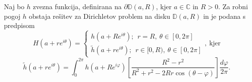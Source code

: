 \documentclass[mat1, tisk]{fmfdelo}
\begin{document}
    \begin{trditev}
        \label{alldisk}
        Naj bo $h$ zvezna funkcija, definirana na $\partial \mathbb{D}(a,R)$, kjer $a \in \mathbb{C}$ in $R>0$.  
        Za robni pogoj $h$ obstaja rešitev za Dirichletov problem na disku $\mathbb{D}(a,R)$ in je podana s predpisom
        $$
            H(a + r e^{i \theta}) = \begin{cases}
                    h(a + R e^{i \theta});~~r = R,~\theta \in [0, 2\pi]\\
                    \widetilde{h}(a + r e^{i \theta});~~ r \in [0,R),~ \theta \in [0, 2\pi]
            \end{cases},~\text{kjer}
        $$
        $$
        \widetilde{h}(a + r e^{i \theta}) = \int_{0}^{2 \pi}{h(a + R e^{i \varphi}) \left[\frac{R^2 - r^2}{R^2 + r^2 - 2Rr \cos(\theta - \varphi)}\right] \frac{d \varphi}{2 \pi}}.
        $$
     \end{trditev}
\end{document}

